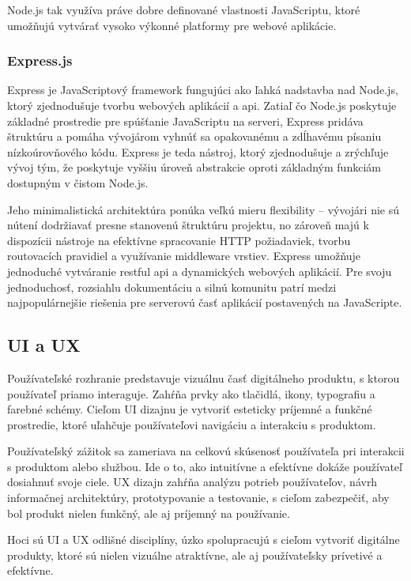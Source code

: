 Node.js tak využíva práve dobre definované vlastnosti JavaScriptu, ktoré umožňujú vytvárať vysoko výkonné platformy pre webové aplikácie.\cite{nodejs}
\subsubsection{Express.js}
Express je JavaScriptový framework fungujúci ako ľahká nadstavba nad Node.js, ktorý zjednodušuje tvorbu webových aplikácií a \acrshort{api}.
Zatiaľ čo Node.js poskytuje základné prostredie pre spúšťanie JavaScriptu na serveri, Express pridáva štruktúru a pomáha vývojárom vyhnúť sa opakovanému a zdĺhavému písaniu nízkoúrovňového kódu. 
Express je teda nástroj, ktorý zjednodušuje a zrýchľuje vývoj tým, že poskytuje vyššiu úroveň abstrakcie oproti základným funkciám dostupným v čistom Node.js.

Jeho minimalistická architektúra ponúka veľkú mieru flexibility – vývojári nie sú nútení dodržiavať presne stanovenú štruktúru projektu, no zároveň majú k dispozícii nástroje na efektívne spracovanie HTTP požiadaviek, tvorbu routovacích pravidiel a využívanie middleware vrstiev. 
Express umožňuje jednoduché vytváranie \acrshort{rest}ful \acrshort{api} a dynamických webových aplikácií.
Pre svoju jednoduchosť, rozsiahlu dokumentáciu a silnú komunitu patrí medzi najpopulárnejšie riešenia pre serverovú časť aplikácií postavených na JavaScripte.\cite{express}\cite{backendframework}
\subsection{UI a UX}
Používateľské rozhranie predstavuje vizuálnu časť digitálneho produktu, s ktorou používateľ priamo interaguje. 
Zahŕňa prvky ako tlačidlá, ikony, typografiu a farebné schémy. 
Cieľom UI dizajnu je vytvoriť esteticky príjemné a funkčné prostredie, ktoré uľahčuje používateľovi navigáciu a interakciu s produktom.

Používateľský zážitok sa zameriava na celkovú skúsenosť používateľa pri interakcii s produktom alebo službou. 
Ide o to, ako intuitívne a efektívne dokáže používateľ dosiahnuť svoje ciele. 
UX dizajn zahŕňa analýzu potrieb používateľov, návrh informačnej architektúry, prototypovanie a testovanie, s cieľom zabezpečiť, aby bol produkt nielen funkčný, ale aj príjemný na používanie.

Hoci sú UI a UX odlišné disciplíny, úzko spolupracujú s cieľom vytvoriť digitálne produkty, ktoré sú nielen vizuálne atraktívne, ale aj používateľsky prívetivé a efektívne.\cite{uiux}
